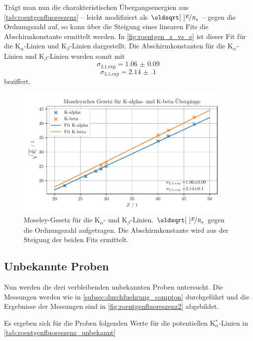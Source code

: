 \documentclass[ngerman]{scrartcl}
\begin{document}
%
Trägt man nun die charakteristischen Übergangsenergien aus \autoref{tab:roentgenfluoreszenz} -- leicht modifiziert als $\sqrt{\nicefrac{E}{R_y}}$ -- gegen die Ordnungszahl auf, so kann über die Steigung eines linearen Fits die Abschirmkonstante ermittelt werden. In \autoref{fig:roentgen_z_vs_e} ist dieser Fit für die K$_{\alpha}$-Linien und K$_{\beta}$-Linien dargestellt. Die Abschirmkonstanten für die K$_{\alpha}$-Linien und K$_{\beta}$-Linien wurden somit mit
\[\sigma_{\text{2,1,exp}} = \num{1.06(9)} \]
\[\sigma_{\text{3,1,exp}} = \num{2.14(10)}\]
beziffert.
%
\begin{figure}[H]
    \centering
    \begin{samepage}
        \includegraphics[width=0.95\textwidth]{../plots/roentgen_data_Z_vs_E.pdf}
        \caption[Mosley-Gesetz für die K$_{\alpha}$- und K$_{\beta}$-Linien.]{Moseley-Gesetz für die K$_{\alpha}$- und K$_{\beta}$-Linien. $\sqrt{\nicefrac{E}{R_y}}$ gegen die Ordnungszahl aufgetragen. Die Abschirmkonstante wird aus der Steigung der beiden Fits ermittelt.}
        \label{fig:roentgen_z_vs_e}
    \end{samepage}
\end{figure}


\subsection{Unbekannte Proben}
\label{sec:roentgen_unbekannt}

Nun werden die drei verbleibenden unbekannten Proben untersucht. Die Messungen werden wie in \autoref{subsec:durchfuehrung_compton} durchgeführt und die Ergebnisse der Messungen sind in \autoref{fig:roentgenfluoreszenz2} abgebildet.

Es ergeben sich für die Proben folgenden Werte für die potentiellen K$_{\alpha}^*$-Linien in \autoref{tab:roentgenfluoreszenz_unbekannt}
\end{document}
